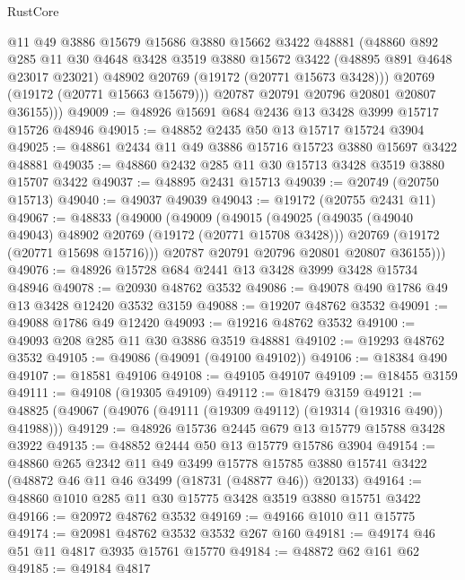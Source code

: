 \begin{lexlean}{RustCore}
\begin{coremodule}
            @11
            @49
            @3886
            @15679
            @15686
            @3880
            @15662
            @3422
            @48881
            (@48860
              @892
              @285
              @11
              @30
              @4648
              @3428
              @3519
              @3880
              @15672
              @3422
              (@48895 @891 @4648 @23017 @23021)
              @48902
              @20769
              (@19172 (@20771 @15673 @3428)))
            @20769
            (@19172 (@20771 @15663 @15679)))
          @20787
          @20791
          @20796
          @20801
          @20807
          @36155)))
@49009 := @48926 @15691 @684 @2436 @13 @3428 @3999 @15717 @15726 @48946
@49015 := @48852 @2435 @50 @13 @15717 @15724 @3904
@49025 := @48861 @2434 @11 @49 @3886 @15716 @15723 @3880 @15697 @3422 @48881
@49035 := @48860 @2432 @285 @11 @30 @15713 @3428 @3519 @3880 @15707 @3422
@49037 := @48895 @2431 @15713
@49039 := @20749 (@20750 @15713)
@49040 := @49037 @49039
@49043 := @19172 (@20755 @2431 @11)
@49067 := @48833
    (@49000
      (@49009
        (@49015
          (@49025
            (@49035 (@49040 @49043) @48902 @20769 (@19172 (@20771 @15708 @3428)))
            @20769
            (@19172 (@20771 @15698 @15716)))
          @20787
          @20791
          @20796
          @20801
          @20807
          @36155)))
@49076 := @48926 @15728 @684 @2441 @13 @3428 @3999 @3428 @15734 @48946
@49078 := @20930 @48762 @3532
@49086 := @49078 @490 @1786 @49 @13 @3428 @12420 @3532 @3159
@49088 := @19207 @48762 @3532
@49091 := @49088 @1786 @49 @12420
@49093 := @19216 @48762 @3532
@49100 := @49093 @208 @285 @11 @30 @3886 @3519 @48881
@49102 := @19293 @48762 @3532
@49105 := @49086 (@49091 (@49100 @49102))
@49106 := @18384 @490
@49107 := @18581 @49106
@49108 := @49105 @49107
@49109 := @18455 @3159
@49111 := @49108 (@19305 @49109)
@49112 := @18479 @3159
@49121 := @48825 (@49067 (@49076 (@49111 (@19309 @49112) (@19314 (@19316 @490)) @41988)))
@49129 := @48926 @15736 @2445 @679 @13 @15779 @15788 @3428 @3922
@49135 := @48852 @2444 @50 @13 @15779 @15786 @3904
@49154 := @48860
    @265
    @2342
    @11
    @49
    @3499
    @15778
    @15785
    @3880
    @15741
    @3422
    (@48872 @46 @11 @46 @3499 (@18731 (@48877 @46)) @20133)
@49164 := @48860 @1010 @285 @11 @30 @15775 @3428 @3519 @3880 @15751 @3422
@49166 := @20972 @48762 @3532
@49169 := @49166 @1010 @11 @15775
@49174 := @20981 @48762 @3532 @3532 @267 @160
@49181 := @49174 @46 @51 @11 @4817 @3935 @15761 @15770
@49184 := @48872 @62 @161 @62
@49185 := @49184 @4817

\end{coremodule}
\end{lexlean}
